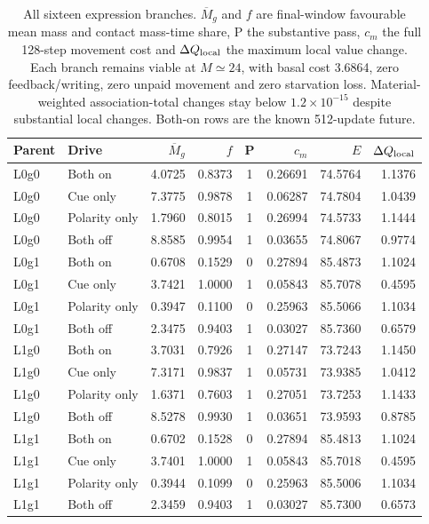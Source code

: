 \begin{table}[htbp]\centering\scriptsize
\caption{All sixteen expression branches. $\overline M_g$ and $f$ are final-window favourable mean mass and contact mass-time share, P the substantive pass, $c_m$ the full 128-step movement cost and $\Delta Q_{\rm local}$ the maximum local value change. Each branch remains viable at $M\simeq24$, with basal cost 3.6864, zero feedback/writing, zero unpaid movement and zero starvation loss. Material-weighted association-total changes stay below $1.2\times10^{-15}$ despite substantial local changes. Both-on rows are the known 512-update future.}\label{tab:polarity-expression}
\setlength{\tabcolsep}{4pt}\begin{tabular}{llrrcrrr}\toprule
Parent & Drive & $\overline M_g$ & $f$ & P & $c_m$ & $E$ & $\Delta Q_{\rm local}$\\\midrule
L0g0 & Both on & 4.0725 & 0.8373 & 1 & 0.26691 & 74.5764 & 1.1376 \\
L0g0 & Cue only & 7.3775 & 0.9878 & 1 & 0.06287 & 74.7804 & 1.0439 \\
L0g0 & Polarity only & 1.7960 & 0.8015 & 1 & 0.26994 & 74.5733 & 1.1444 \\
L0g0 & Both off & 8.8585 & 0.9954 & 1 & 0.03655 & 74.8067 & 0.9774 \\
L0g1 & Both on & 0.6708 & 0.1529 & 0 & 0.27894 & 85.4873 & 1.1024 \\
L0g1 & Cue only & 3.7421 & 1.0000 & 1 & 0.05843 & 85.7078 & 0.4595 \\
L0g1 & Polarity only & 0.3947 & 0.1100 & 0 & 0.25963 & 85.5066 & 1.1034 \\
L0g1 & Both off & 2.3475 & 0.9403 & 1 & 0.03027 & 85.7360 & 0.6579 \\
L1g0 & Both on & 3.7031 & 0.7926 & 1 & 0.27147 & 73.7243 & 1.1450 \\
L1g0 & Cue only & 7.3171 & 0.9837 & 1 & 0.05731 & 73.9385 & 1.0412 \\
L1g0 & Polarity only & 1.6371 & 0.7603 & 1 & 0.27051 & 73.7253 & 1.1433 \\
L1g0 & Both off & 8.5278 & 0.9930 & 1 & 0.03651 & 73.9593 & 0.8785 \\
L1g1 & Both on & 0.6702 & 0.1528 & 0 & 0.27894 & 85.4813 & 1.1024 \\
L1g1 & Cue only & 3.7401 & 1.0000 & 1 & 0.05843 & 85.7018 & 0.4595 \\
L1g1 & Polarity only & 0.3944 & 0.1099 & 0 & 0.25963 & 85.5006 & 1.1034 \\
L1g1 & Both off & 2.3459 & 0.9403 & 1 & 0.03027 & 85.7300 & 0.6573 \\
\bottomrule\end{tabular}\end{table}\FloatBarrier


